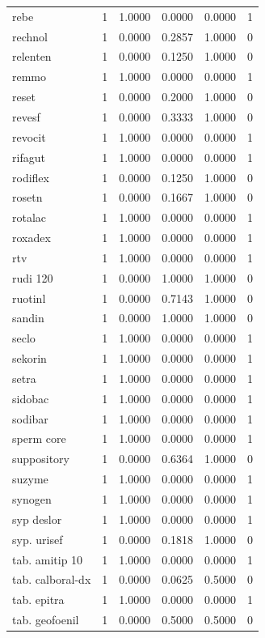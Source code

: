 \begin{longtable}{p{3.0cm}rrrrr}
rebe & 1 & 1.0000 & 0.0000 & 0.0000 & 1 \\
rechnol & 1 & 0.0000 & 0.2857 & 1.0000 & 0 \\
relenten & 1 & 0.0000 & 0.1250 & 1.0000 & 0 \\
remmo & 1 & 1.0000 & 0.0000 & 0.0000 & 1 \\
reset & 1 & 0.0000 & 0.2000 & 1.0000 & 0 \\
revesf & 1 & 0.0000 & 0.3333 & 1.0000 & 0 \\
revocit & 1 & 1.0000 & 0.0000 & 0.0000 & 1 \\
rifagut & 1 & 1.0000 & 0.0000 & 0.0000 & 1 \\
rodiflex & 1 & 0.0000 & 0.1250 & 1.0000 & 0 \\
rosetn & 1 & 0.0000 & 0.1667 & 1.0000 & 0 \\
rotalac & 1 & 1.0000 & 0.0000 & 0.0000 & 1 \\
roxadex & 1 & 1.0000 & 0.0000 & 0.0000 & 1 \\
rtv & 1 & 1.0000 & 0.0000 & 0.0000 & 1 \\
rudi 120 & 1 & 0.0000 & 1.0000 & 1.0000 & 0 \\
ruotinl & 1 & 0.0000 & 0.7143 & 1.0000 & 0 \\
sandin & 1 & 0.0000 & 1.0000 & 1.0000 & 0 \\
seclo & 1 & 1.0000 & 0.0000 & 0.0000 & 1 \\
sekorin & 1 & 1.0000 & 0.0000 & 0.0000 & 1 \\
setra & 1 & 1.0000 & 0.0000 & 0.0000 & 1 \\
sidobac & 1 & 1.0000 & 0.0000 & 0.0000 & 1 \\
sodibar & 1 & 1.0000 & 0.0000 & 0.0000 & 1 \\
sperm core & 1 & 1.0000 & 0.0000 & 0.0000 & 1 \\
suppository & 1 & 0.0000 & 0.6364 & 1.0000 & 0 \\
suzyme & 1 & 1.0000 & 0.0000 & 0.0000 & 1 \\
synogen & 1 & 1.0000 & 0.0000 & 0.0000 & 1 \\
syp deslor & 1 & 1.0000 & 0.0000 & 0.0000 & 1 \\
syp. urisef & 1 & 0.0000 & 0.1818 & 1.0000 & 0 \\
tab. amitip 10 & 1 & 1.0000 & 0.0000 & 0.0000 & 1 \\
tab. calboral-dx & 1 & 0.0000 & 0.0625 & 0.5000 & 0 \\
tab. epitra & 1 & 1.0000 & 0.0000 & 0.0000 & 1 \\
tab. geofoenil & 1 & 0.0000 & 0.5000 & 0.5000 & 0 \\

\end{longtable}

